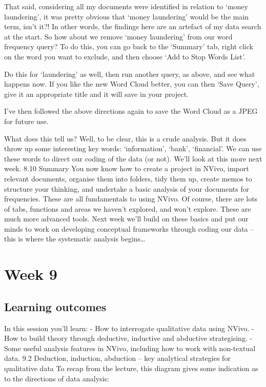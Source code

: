\documentclass[
]{book}
\begin{document}
That said, considering all my documents were identified in relation to `money laundering', it was pretty obvious that `money laundering' would be the main term, isn't it?! In other words, the findings here are an artefact of my data search at the start.
So how about we remove `money laundering' from our word frequency query? To do this, you can go back to the `Summary' tab, right click on the word you want to exclude, and then choose `Add to Stop Words List'.

Do this for `laundering' as well, then run another query, as above, and see what happens now.
If you like the new Word Cloud better, you can then `Save Query', give it an appropriate title and it will save in your project.

I've then followed the above directions again to save the Word Cloud as a JPEG for future use.

What does this tell us? Well, to be clear, this is a crude analysis. But it does throw up some interesting key words: `information', `bank', `financial'.
We can use these words to direct our coding of the data (or not). We'll look at this more next week.
8.10 Summary
You now know how to create a project in NVivo, import relevant documents, organise them into folders, tidy them up, create memos to structure your thinking, and undertake a basic analysis of your documents for frequencies.
These are all fundamentals to using NVivo. Of course, there are lots of tabs, functions and areas we haven't explored, and won't explore. These are much more advanced tools.
Next week we'll build on these basics and put our minds to work on developing conceptual frameworks through coding our data -- this is where the systematic analysis begins\ldots{}

\hypertarget{week9}{%
\chapter{Week 9}\label{week9}}

\hypertarget{learning-outcomes-8}{%
\section{Learning outcomes}\label{learning-outcomes-8}}

In this session you'll learn:
- How to interrogate qualitative data using NVivo.
- How to build theory through deductive, inductive and abductive strategising.
- Some useful analysis features in NVivo, including how to work with non-textual data.
9.2 Deduction, induction, abduction -- key analytical strategies for qualitative data
To recap from the lecture, this diagram gives some indication as to the directions of data analysis:
\end{document}
